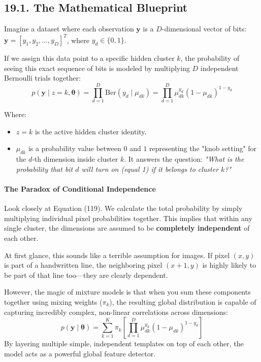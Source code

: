 \documentclass{article}
\begin{document}
\subsection*{19.1. The Mathematical Blueprint}
Imagine a dataset where each observation $\mathbf{y}$ is a $D$-dimensional vector of bits: $\mathbf{y} = [y_1, y_2, \dots, y_D]^T$, where $y_d \in \{0, 1\}$. 

If we assign this data point to a specific hidden cluster $k$, the probability of seeing this exact sequence of bits is modeled by multiplying $D$ independent Bernoulli trials together:
\begin{equation}
p(\mathbf{y} \mid z = k, \boldsymbol{\theta}) = \prod_{d=1}^D \text{Ber}(y_d \mid \mu_{dk}) = \prod_{d=1}^D \mu_{dk}^{y_d} (1 - \mu_{dk})^{1 - y_d} \tag{119}
\end{equation}

Where:
\begin{itemize}
    \item $z = k$ is the active hidden cluster identity.
    \item $\mu_{dk}$ is a probability value between $0$ and $1$ representing the "knob setting" for the $d$-th dimension inside cluster $k$. It answers the question: \textit{"What is the probability that bit $d$ will turn on (equal 1) if it belongs to cluster $k$?"}
\end{itemize}

\paragraph{The Paradox of Conditional Independence}
Look closely at Equation (119). We calculate the total probability by simply multiplying individual pixel probabilities together. This implies that within any single cluster, the dimensions are assumed to be \textbf{completely independent} of each other. 

At first glance, this sounds like a terrible assumption for images. If pixel $(x, y)$ is part of a handwritten line, the neighboring pixel $(x+1, y)$ is highly likely to be part of that line too—they are clearly dependent. 

However, the magic of mixture models is that when you sum these components together using mixing weights ($\pi_k$), the resulting global distribution is capable of capturing incredibly complex, non-linear correlations across dimensions:
\begin{equation}
p(\mathbf{y} \mid \boldsymbol{\theta}) = \sum_{k=1}^K \pi_k \left[ \prod_{d=1}^D \mu_{dk}^{y_d} (1 - \mu_{dk})^{1 - y_d} \right] \tag{120}
\end{equation}
By layering multiple simple, independent templates on top of each other, the model acts as a powerful global feature detector.
\end{document}
